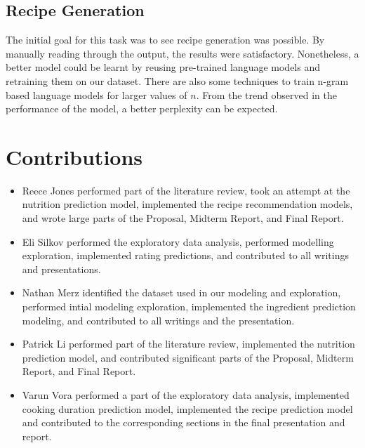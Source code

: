 \documentclass[sigconf]{acmart}
\begin{document}
\subsection{Recipe Generation}
The initial goal for this task was to see recipe generation was possible. By manually reading through the output, the results were satisfactory. Nonetheless, a better model could be learnt by reusing pre-trained language models and retraining them on our dataset. There are also some techniques to train n-gram based language models for larger values of $n$.\cite{RG_GrowingNGramModels} From the trend observed in the performance of the model, a better perplexity can be expected.
\section{Contributions}

\begin{itemize}
    \item 
    Reece Jones performed part of the literature review, took an attempt at the nutrition prediction model, implemented the recipe recommendation models, and wrote large parts of the Proposal, Midterm Report, and Final Report.
    
    \item
    Eli Silkov performed the exploratory data analysis, performed modelling exploration, implemented rating predictions, and contributed to all writings and presentations.
    
    \item
    Nathan Merz identified the dataset used in our modeling and exploration, performed intial modeling exploration, implemented the ingredient prediction modeling, and contributed to all writings and the presentation.
    
    \item
    Patrick Li performed part of the literature review, implemented the nutrition prediction model, and contributed significant parts of the Proposal, Midterm Report, and Final Report.
    
    \item
    Varun Vora performed a part of the exploratory data analysis, implemented cooking duration prediction model, implemented the recipe prediction model and contributed to the corresponding sections in the final presentation and report.
\end{itemize}
\end{document}
